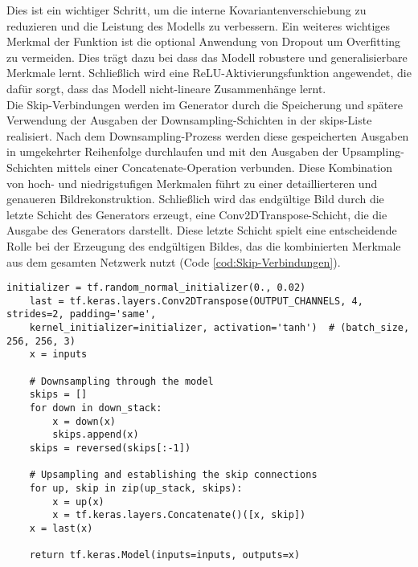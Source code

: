 Dies ist ein wichtiger Schritt, um die interne Kovariantenverschiebung zu reduzieren und die Leistung des Modells zu verbessern. Ein weiteres wichtiges Merkmal der Funktion ist die optional Anwendung von Dropout um Overfitting zu vermeiden. Dies trägt dazu bei dass das Modell robustere und generalisierbare Merkmale lernt. Schließlich wird eine ReLU-Aktivierungsfunktion angewendet, die dafür sorgt, dass das Modell nicht-lineare Zusammenhänge lernt. 
\\\newline
Die Skip-Verbindungen werden im Generator durch die Speicherung und spätere Verwendung der Ausgaben der Downsampling-Schichten in der skips-Liste realisiert. Nach dem Downsampling-Prozess werden diese gespeicherten Ausgaben in umgekehrter Reihenfolge durchlaufen und mit den Ausgaben der Upsampling-Schichten mittels einer Concatenate-Operation verbunden. Diese Kombination von hoch- und niedrigstufigen Merkmalen führt zu einer detaillierteren und genaueren Bildrekonstruktion.
\newline
Schließlich wird das endgültige Bild durch die letzte Schicht des Generators erzeugt, eine Conv2DTranspose-Schicht, die die Ausgabe des Generators darstellt. Diese letzte Schicht spielt eine entscheidende Rolle bei der Erzeugung des endgültigen Bildes, das die kombinierten Merkmale aus dem gesamten Netzwerk nutzt (Code \ref{cod:Skip-Verbindungen}).

\begin{lstlisting}[language=pyhaff, caption={Skip Verbindungen in Pix2Pix}, label={cod:Skip-Verbindungen}]
	initializer = tf.random_normal_initializer(0., 0.02)
	last = tf.keras.layers.Conv2DTranspose(OUTPUT_CHANNELS, 4, strides=2, padding='same',
	kernel_initializer=initializer, activation='tanh')  # (batch_size, 256, 256, 3)
	x = inputs
	
	# Downsampling through the model
	skips = []
	for down in down_stack:
		x = down(x)
		skips.append(x)
	skips = reversed(skips[:-1])
	
	# Upsampling and establishing the skip connections
	for up, skip in zip(up_stack, skips):
		x = up(x)
		x = tf.keras.layers.Concatenate()([x, skip])
	x = last(x)
	
	return tf.keras.Model(inputs=inputs, outputs=x)
\end{lstlisting}

